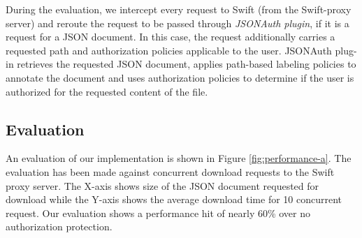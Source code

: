  During the evaluation, we intercept every request to Swift (from the Swift-proxy server) and reroute the request to be passed through \textit{JSONAuth plugin}, if it is a request for a JSON document. In this case, the request additionally carries a requested path and authorization policies applicable to the user. JSONAuth plug-in retrieves the requested JSON document, applies path-based labeling policies to annotate the document and uses authorization policies to determine if the user is authorized for the requested content of the file. 

\subsection{Evaluation}



An evaluation of our implementation is shown in Figure \ref{fig:performance-a}. The evaluation has been made against concurrent download requests to the Swift proxy server. The X-axis shows size of the JSON document requested for download while the Y-axis shows the average download time for 10 concurrent request. Our evaluation shows a performance hit of nearly 60\% over no authorization protection.


